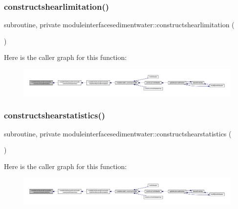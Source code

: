 \subsubsection{\texorpdfstring{constructshearlimitation()}{constructshearlimitation()}}
{\footnotesize\ttfamily subroutine, private moduleinterfacesedimentwater\+::constructshearlimitation (\begin{DoxyParamCaption}{ }\end{DoxyParamCaption})\hspace{0.3cm}{\ttfamily [private]}}

Here is the caller graph for this function\+:\nopagebreak
\begin{figure}[H]
\begin{center}
\leavevmode
\includegraphics[width=350pt]{namespacemoduleinterfacesedimentwater_a2072a215e8db4306324a2b30c102ae15_icgraph}
\end{center}
\end{figure}
\mbox{\label{namespacemoduleinterfacesedimentwater_a791c68b5d42b6f1a6b1fe8183420147b}} 
\subsubsection{\texorpdfstring{constructshearstatistics()}{constructshearstatistics()}}
{\footnotesize\ttfamily subroutine, private moduleinterfacesedimentwater\+::constructshearstatistics (\begin{DoxyParamCaption}{ }\end{DoxyParamCaption})\hspace{0.3cm}{\ttfamily [private]}}

Here is the caller graph for this function\+:\nopagebreak
\begin{figure}[H]
\begin{center}
\leavevmode
\includegraphics[width=350pt]{namespacemoduleinterfacesedimentwater_a791c68b5d42b6f1a6b1fe8183420147b_icgraph}
\end{center}
\end{figure}
\mbox{\label{namespacemoduleinterfacesedimentwater_afdce65eb974d56a59cfb4d3ba2145d99}} 
